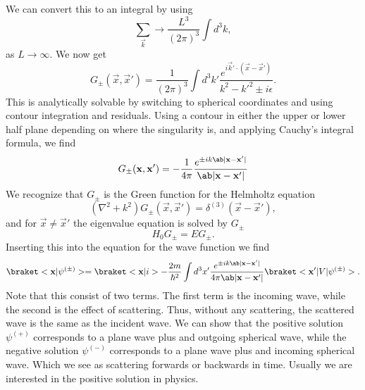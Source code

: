 We can convert this to an integral by using
\begin{equation}
    \sum_{\vec{k}} \to \frac{L^3}{(2\pi)^3} \int d^3 k,
\end{equation}
as $L \to \infty$. We now get
\begin{equation}
    G_\pm (\vec{x}, \vec{x}') = \frac{1}{(2\pi)^3} \int d^3 k' \frac{e^{i\vec{k}'\cdot(\vec{x} - \vec{x}')}}{k^2 - k'^2 \pm i \epsilon}.
\end{equation}
This is analytically solvable by switching to spherical coordinates and using contour integration and residuals. Using a contour in either the upper or lower half plane depending on where the singularity is, and applying Cauchy's integral formula, we find
\begin{equation}
    G_\pm (\vec{x}, \vec{x}') = -\frac{1}{4\pi} \frac{e^{\pm i  k\abs{\vec{x} - \vec{x}'}}}{\abs{\vec{x}-\vec{x}'}}
\end{equation}
We recognize that $G_\pm$ is the Green function for the Helmholtz equation
\begin{equation}
    (\nabla^2 + k^2)G_\pm(\vec{x},\vec{x}') = \delta^{(3)}(\vec{x}-\vec{x}'),
\end{equation}
and for $\vec{x}\neq \vec{x}'$ the eigenvalue equation is solved by $G_\pm$
\begin{equation}
    H_0 G_\pm = E G_\pm.
\end{equation}
Inserting this into the equation for the wave function we find
\begin{equation}
    \bk{\vec{x}}{\psi^{(\pm)}} = \bk{\vec{x}}{i} - \frac{2m}{\hbar^2} \int d^3 x' \frac{e^{\pm ik\abs{\vec{x}-\vec{x}'}}}{4\pi\abs{\vec{x}-\vec{x}'}} \bkop{\vec{x}'}{V}{\psi^{(\pm)}}.
\end{equation}
Note that this consist of two terms. The first term is the incoming wave, while the second is the effect of scattering. Thus, without any scattering, the scattered wave is the same as the incident wave. We can show that the positive solution $\psi^{(+)}$ corresponds to a plane wave plus and outgoing spherical wave, while the negative solution $\psi^{(-)}$ corresponds to a plane wave plus and incoming spherical wave. Which we see as scattering forwards or backwards in time. Usually we are interested in the positive solution in physics.

